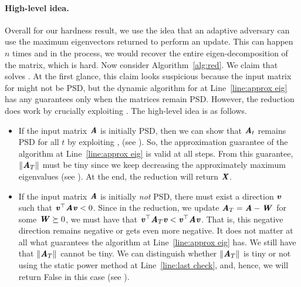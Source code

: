 \paragraph{High-level idea.}
 Overall for our hardness result, we use the idea that an adaptive adversary can use the maximum eigenvectors returned to perform an update. This can happen $n$ times and in the process, we would recover the entire eigen-decomposition of the matrix, which is hard. Now consider Algorithm~\ref{alg:red}. We claim that  solves . 
At the first glance, this claim looks suspicious because the input matrix for  might not be PSD, but the dynamic algorithm for  at Line~\ref{line:approx eig} has any guarantees only when the matrices remain PSD. 
However, the reduction does work by crucially exploiting . The high-level idea is as follows. 
\begin{itemize}
    \item If the input matrix $\AA$ is initially PSD, then we can show that $\AA_t$ remains PSD for all $t$  by exploiting , (see ). So, the approximation guarantee of the algorithm at Line~\ref{line:approx eig} is valid at all steps.
    From this guarantee, $\|\AA_T\|$ must be tiny since we keep decreasing the approximately maximum eigenvalues (see ). At the end, the reduction will return $\XX$.
    \item If the input matrix $\AA$ is initially \emph{not} PSD, there must exist a direction $\vv$ such that $\vv^{\top}\AA\vv <0$. Since in the reduction, we update $\AA_T = \AA - \WW$ for some $\WW \succeq 0$, we must have that $\vv^{\top}\AA_T\vv <\vv^{\top}\AA\vv$. That is, this negative direction remains negative or gets even more negative. It does not matter at all what guarantees the algorithm at Line~\ref{line:approx eig} has. We still have that $\|\AA_T\|$ cannot be tiny. We can distinguish whether $\|\AA_T\|$ is tiny or not using the static power method at Line~\ref{line:last check}, and, hence, we will return {\sc False} in this case (see ).
\end{itemize}





